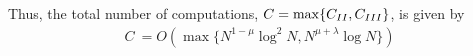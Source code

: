 \begin{enumerate}
\end{enumerate}

Thus, the total number of computations, $C = \max\{C_{\RNum{2}},C_{\RNum{3}}\} $, is given by
  \begin{align*}
  C ~ = O(\max\{N^{1-\mu}\log^2 N, N^{\mu+\lambda}\log N \})
  \end{align*}
